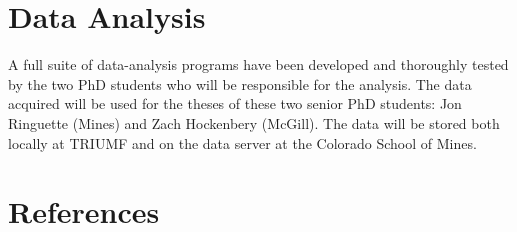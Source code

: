 \documentclass[12pt]{article}
\begin{document}
\section{Data Analysis}
A full suite of data-analysis programs have been developed and thoroughly tested by the two PhD students who will be responsible for the analysis.  The data acquired will be used for the theses of these two senior PhD students: Jon Ringuette (Mines) and Zach Hockenbery (McGill).  The data will be stored both locally at TRIUMF and on the data server at the Colorado School of Mines.


\section{References}

\end{document}
